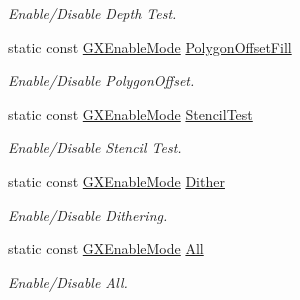 \begin{DoxyCompactItemize}
\begin{DoxyCompactList}\small\item\em Enable/\+Disable Depth Test. \end{DoxyCompactList}\item 
static const \hyperlink{class_magnum_1_1_g_x_enable_mode}{G\+X\+Enable\+Mode} \hyperlink{class_magnum_1_1_g_x_enable_mode_ad0dfe71514252c88e4a6f32ccbe0113a}{Polygon\+Offset\+Fill}\hypertarget{class_magnum_1_1_g_x_enable_mode_ad0dfe71514252c88e4a6f32ccbe0113a}{}\label{class_magnum_1_1_g_x_enable_mode_ad0dfe71514252c88e4a6f32ccbe0113a}

\begin{DoxyCompactList}\small\item\em Enable/\+Disable Polygon\+Offset. \end{DoxyCompactList}\item 
static const \hyperlink{class_magnum_1_1_g_x_enable_mode}{G\+X\+Enable\+Mode} \hyperlink{class_magnum_1_1_g_x_enable_mode_a48884f0d932e65687f1d2b54ce982371}{Stencil\+Test}\hypertarget{class_magnum_1_1_g_x_enable_mode_a48884f0d932e65687f1d2b54ce982371}{}\label{class_magnum_1_1_g_x_enable_mode_a48884f0d932e65687f1d2b54ce982371}

\begin{DoxyCompactList}\small\item\em Enable/\+Disable Stencil Test. \end{DoxyCompactList}\item 
static const \hyperlink{class_magnum_1_1_g_x_enable_mode}{G\+X\+Enable\+Mode} \hyperlink{class_magnum_1_1_g_x_enable_mode_a67ef4fc53f0850027bbd33cf04d09d97}{Dither}\hypertarget{class_magnum_1_1_g_x_enable_mode_a67ef4fc53f0850027bbd33cf04d09d97}{}\label{class_magnum_1_1_g_x_enable_mode_a67ef4fc53f0850027bbd33cf04d09d97}

\begin{DoxyCompactList}\small\item\em Enable/\+Disable Dithering. \end{DoxyCompactList}\item 
static const \hyperlink{class_magnum_1_1_g_x_enable_mode}{G\+X\+Enable\+Mode} \hyperlink{class_magnum_1_1_g_x_enable_mode_ab2290f8be49a64c02246d4394e81dc93}{All}\hypertarget{class_magnum_1_1_g_x_enable_mode_ab2290f8be49a64c02246d4394e81dc93}{}\label{class_magnum_1_1_g_x_enable_mode_ab2290f8be49a64c02246d4394e81dc93}

\begin{DoxyCompactList}\small\item\em Enable/\+Disable All. \end{DoxyCompactList}\end{DoxyCompactItemize}


